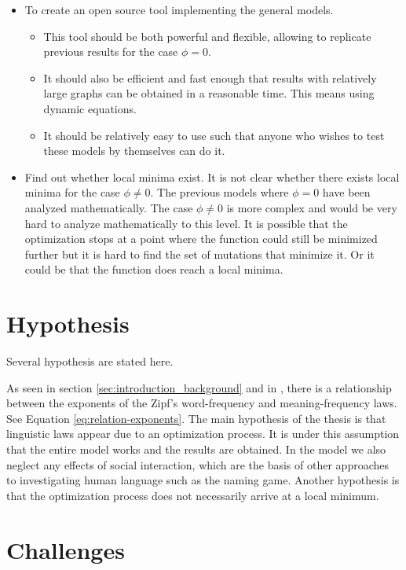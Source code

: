 \begin{itemize}
\item
  To create an open source tool implementing the general models.
  \begin{itemize}
  \item
    This tool should be both powerful and flexible, allowing to replicate previous results for the case $\phi=0$.
  \item
    It should also be efficient and fast enough that results with relatively large graphs can be obtained in a reasonable time. This means using dynamic equations.
  \item
    It should be relatively easy to use such that anyone who wishes to test these models by themselves can do it.
  \end{itemize}
\item
  Find out whether local minima exist.
  It is not clear whether there exists local minima for the case $\phi \neq 0$.
  The previous models where $\phi = 0$ have been analyzed mathematically.
 \cite{Salge2015} \cite{Prokopenko2010}
  The case $\phi \neq 0$ is more complex and would be very hard to analyze mathematically to this level.
  It is possible that the optimization stops at a point where the function could still be minimized further but it is hard to find the set of mutations that minimize it.
  Or it could be that the function does reach a local minima.
\end{itemize}

\section{Hypothesis}
\label{sec:introduction_hypothesis}

Several hypothesis are stated here.

As seen in section \ref{sec:introduction_background} and in \cite{Ferrer2018a}, there is a relationship between the exponents of the Zipf's word-frequency and meaning-frequency laws.
See Equation \eqref{eq:relation-exponents}.
The main hypothesis of the thesis is that linguistic laws appear due to an optimization process.
It is under this assumption that the entire model works and the results are obtained.
In the model we also neglect any effects of social interaction, which are the basis of other approaches to investigating human language such as the naming game. \cite{Baronchelli2006}
Another hypothesis is that the optimization process does not necessarily arrive at a local minimum.

\section{Challenges}
\label{sec:introduction_challenges}

